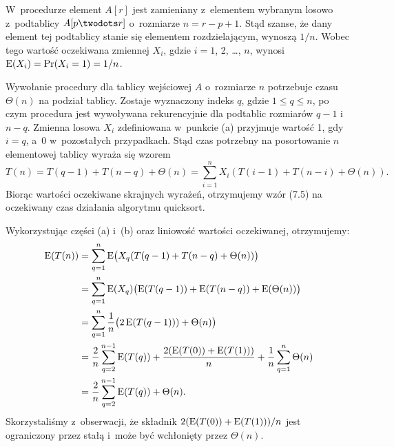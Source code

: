 
\subproblem %
W~procedurze  element $A[r]$ jest zamieniany z~elementem wybranym losowo z~podtablicy $A[p\twodots r]$ o~rozmiarze $n=r-p+1$.
Stąd szanse, że dany element tej podtablicy stanie się elementem rozdzielającym, wynoszą $1/n$.
Wobec tego wartość oczekiwana zmiennej $X_i$, gdzie $i=1$, 2, \dots, $n$, wynosi $\operatorname{E}(X_i)=\Pr(X_i=1)=1/n$.

\subproblem %
Wywołanie procedury  dla tablicy wejściowej $A$ o~rozmiarze $n$ potrzebuje czasu $\Theta(n)$ na podział tablicy.
Zostaje wyznaczony indeks $q$, gdzie $1\le q\le n$, po czym procedura jest wywoływana rekurencyjnie dla podtablic rozmiarów $q-1$ i~$n-q$.
Zmienna losowa $X_i$ zdefiniowana w~punkcie (a) przyjmuje wartość 1, gdy $i=q$, a~0 w~pozostałych przypadkach.
Stąd czas potrzebny na posortowanie $n$\nbhyphen elementowej tablicy wyraża się wzorem
\[
	T(n) = T(q-1)+T(n-q)+\Theta(n) = \sum_{i=1}^nX_i(T(i-1)+T(n-i)+\Theta(n)).
\]
Biorąc wartości oczekiwane skrajnych wyrażeń, otrzymujemy wzór (7.5) na oczekiwany czas działania algorytmu quicksort.

\subproblem %

\noindent Wykorzystując części (a) i~(b) oraz liniowość wartości oczekiwanej, otrzymujemy:
\begin{align*}
	\operatorname{E}(T(n)) &= \sum_{q=1}^n\operatorname{E}\bigl(X_q(T(q-1)+T(n-q)+\Theta(n))\bigr) \\
	&= \sum_{q=1}^n\operatorname{E}(X_q)\bigl(\operatorname{E}(T(q-1))+\operatorname{E}(T(n-q))+\operatorname{E}(\Theta(n))\bigr) \\
	&= \sum_{q=1}^n\frac{1}{n}\bigl(2\operatorname{E}(T(q-1)))+\Theta(n)\bigr) \\
	&= \frac{2}{n}\sum_{q=2}^{n-1}\operatorname{E}(T(q))+\frac{2(\operatorname{E}(T(0))+\operatorname{E}(T(1)))}{n}+\frac{1}{n}\sum_{q=1}^n\Theta(n) \\
	&= \frac{2}{n}\sum_{q=2}^{n-1}\operatorname{E}(T(q))+\Theta(n).
\end{align*}
Skorzystaliśmy z~obserwacji, że składnik $2(\operatorname{E}(T(0))+\operatorname{E}(T(1)))/n$ jest ograniczony przez stałą i~może być wchłonięty przez $\Theta(n)$.

\subproblem %

